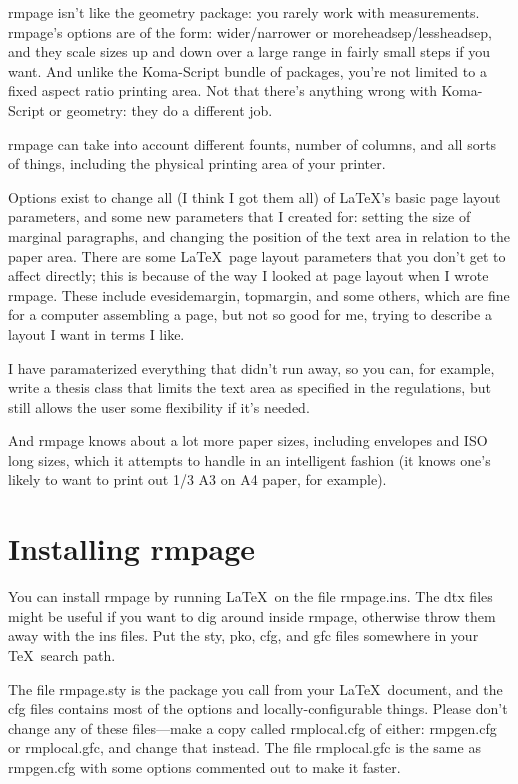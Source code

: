 \documentclass[11pt,loose,twoside,touchwider,longish,
                      noheaders,a4paper,notstdmargins]{report}
\newcommand*{\filename}[1]{{\ttfamily #1}}
\newcommand*{\packname}[1]{{\sffamily #1}}
\DeclareRobustCommand*{\comname}[1]{{\ttfamily\makeatletter\bs #1\makeatother}}
\newcommand*{\classname}[1]{{\ttfamily #1}}
\newcommand*{\optname}[1]{{\ttfamily #1}}
\newcommand*{\rmpage}{\classname{rmpage}\xspace}
\begin{document}
\rmpage isn't like the \packname{geometry} package: you rarely work
with measurements\@.  \rmpage's options are of the form:
\optname{wider}/\optname{narrower} or
\optname{moreheadsep}/\optname{lessheadsep}, and they scale sizes up
and down over a large range in fairly small steps if you want.  And
unlike the \packname{Koma-Script} bundle of packages, you're not
limited to a fixed aspect ratio printing area.  Not that there's
anything wrong with \packname{Koma-Script} or \packname{geometry}:
they do a different job.

\rmpage can take into account different founts, number of columns, and
all sorts of things, including the physical printing area of your
printer.

Options exist to change all (I think I got them all) of \LaTeX's basic
page layout parameters, and some new parameters that I created for:
setting the size of marginal paragraphs, and changing the position of
the text area in relation to the paper area.  There are some  \LaTeX\
page layout parameters that you don't get to affect
directly; this is because of the way I looked at page layout when I
wrote \rmpage.  These include \comname{evesidemargin},
\comname{topmargin}, and some others, which are fine for a computer
assembling a page, but not so good for me, trying to describe a
layout I want in terms I like.

I have paramaterized everything that didn't run away, so you can, for
example, write a thesis class that limits the text area as
specified in the regulations, but still allows the user some
flexibility if it's needed.

And \rmpage knows about a lot more paper sizes, including envelopes
and ISO long sizes, which it attempts to handle in an intelligent
fashion (it knows one's likely to want to print out 1/3 A3 on A4
paper, for example).

\section{Installing \rmpage}

You can install \rmpage by running \LaTeX\ on the file
\filename{rmpage.ins}.  The \filename{dtx} files might be useful if
you want to dig around inside \rmpage, otherwise throw them away with
the \filename{ins} files.  Put the \filename{sty}, \filename{pko},
\filename{cfg}, and \filename{gfc} files somewhere in your \TeX\
search path.

The file \filename{rmpage.sty} is the package you call from your
\LaTeX\ document, and the \filename{cfg} files contains most of the
options and locally-configurable things.  Please don't change any of
these files---make a copy called \filename{rmplocal.cfg} of either:
\filename{rmpgen.cfg} or \filename{rmplocal.gfc}, and change that
instead.  The file \filename{rmplocal.gfc} is the same as
\filename{rmpgen.cfg} with some options commented out to make it
faster.
\end{document}
